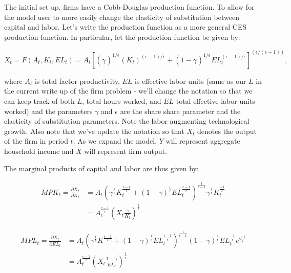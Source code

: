 \documentclass[letterpaper,12pt]{article}
\theoremstyle{definition}
\begin{document}
\begin{spacing}{1.5}
The initial set up, firms have a Cobb-Douglas production function. To allow for the model user to more easily change the elasticity of substitution between capital and labor. Let's write the production function as a more general CES production function.  In particular, let the production function be given by:

\begin{equation}
X_{t}  = F(A_{t},K_{t},EL_{t})= A_{t} \left[(\gamma_{})^{1/\epsilon_{}}(K_{t})^{(\epsilon-1)/\epsilon_{}}+(1-\gamma_{})^{1/\epsilon_{}}EL_{t}^{(\epsilon_{}-1)/\epsilon_{}}\right]^{(\epsilon_{}/(\epsilon_{}-1))},
\end{equation}

\noindent\noindent where $A_{t}$ is total factor productivity, $EL$ is effective labor units (same as our $L$ in the current write up of the firm problem - we'll change the notation so that we can keep track of both $L$, total hours worked, and $EL$ total effective labor units worked) and the parameters $\gamma$ and $\epsilon$ are the share share parameter and the elasticity of substitution parameters.  Note the labor augmenting technological growth. Also note that we've update the notation so that $X_{t}$ denotes the output of the firm in period $t$.  As we expand the model, $Y$ will represent aggregate household income and $X$ will represent firm output.

The marginal products of capital and labor are thus given by:

\begin{equation}
\label{eqn:mpk}
\begin{split}
MPK_{t}=\frac{\partial X_{t}}{\partial K_{t}}&= A_{t}\left(\gamma^{\frac{1}{\epsilon}}K_{t}^{\frac{\epsilon-1}{\epsilon}} + (1-\gamma)^{\frac{1}{\epsilon}}EL_{t}^{\frac{\epsilon-1}{\epsilon}}\right)^{\frac{1}{\epsilon-1}}\gamma^{\frac{1}{\epsilon}}K_{t}^{\frac{-1}{\epsilon}}\\
& = A_{t}^{\frac{\epsilon-1}{\epsilon}}\left(X_{t}\frac{\gamma}{K_{t}}\right)^{\frac{1}{\epsilon}}
\end{split}
\end{equation}

\begin{equation}
\label{eqn:mpl}
\begin{split}
MPL_{t}=\frac{\partial X_{t}}{\partial EL_{t}}&=A_{t}\left(\gamma^{\frac{1}{\epsilon}}K^{\frac{\epsilon-1}{\epsilon}} + (1-\gamma)^{\frac{1}{\epsilon}}EL_{t}^{\frac{\epsilon-1}{\epsilon}}\right)^{\frac{1}{\epsilon-1}}(1-\gamma)^{\frac{1}{\epsilon}}EL_{t}^{\frac{-1}{\epsilon}}e^{g_{y}t}\\
& = A_{t}^{\frac{\epsilon-1}{\epsilon}}\left(X_{t}\frac{1-\gamma}{EL_{t}}\right)^{\frac{1}{\epsilon}}
\end{split}
\end{equation}


\end{spacing}
\end{document}
